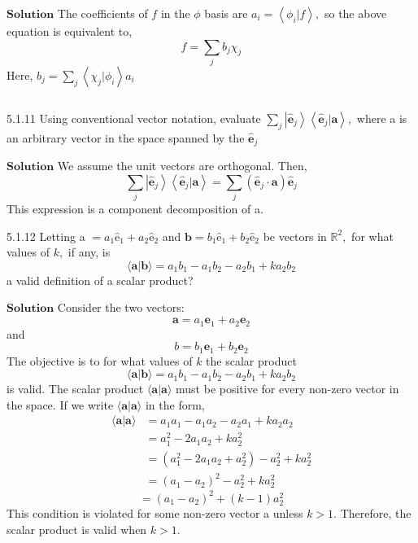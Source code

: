 $\boxed{\textbf{Solution}}$ The coefficients of $f$ in the $\phi$ basis are $a_{i}=\left\langle\phi_{i} | f\right\rangle,$ so the above equation is equivalent to,
$$
f=\sum_{j} b_{j} \chi_{j}
$$
Here, $b_{j}=\sum_{j}\left\langle\chi_{j} | \phi_{i}\right\rangle a_{i}$

$$$$

\begin{mybox}{5.1.11}
Using conventional vector notation, evaluate $\sum_{j}\left|\hat{\mathbf{e}}_{j}\right\rangle\left\langle\hat{\mathbf{e}}_{j} | \mathbf{a}\right\rangle,$ where a is an arbitrary vector in the space spanned by the $\hat{\mathbf{e}}_{j}$
\end{mybox}

$\boxed{\textbf{Solution}}$  We assume the unit vectors are orthogonal. Then,
$$
\sum_{j}\left|\hat{\mathbf{e}}_{j}\right\rangle\left\langle\hat{\mathbf{e}}_{j} | \mathbf{a}\right\rangle=\sum_{j}\left(\hat{\mathbf{e}}_{j} \cdot \mathbf{a}\right) \hat{\mathbf{e}}_{j}
$$
This expression is a component decomposition of a.

\newpage


\begin{mybox}{5.1.12}
Letting a $=a_{1} \hat{\mathrm{e}}_{1}+a_{2} \hat{\mathrm{e}}_{2}$ and $\mathbf{b}=b_{1} \hat{\mathrm{e}}_{1}+b_{2} \hat{\mathrm{e}}_{2}$ be vectors in $\mathbb{R}^{2},$ for what values of $k,$ if
any, is
$$
\langle\mathbf{a} | \mathbf{b}\rangle=a_{1} b_{1}-a_{1} b_{2}-a_{2} b_{1}+k a_{2} b_{2}
$$
a valid definition of a scalar product?
\end{mybox}

$\boxed{\textbf{Solution}}$ Consider the two vectors:
$$\mathbf{a}=a_{1} \mathbf{e}_{1}+a_{2} \mathbf{e}_{2}$$ 
and 
$$b=b_{1} \mathbf{e}_{1}+b_{2} \mathbf{e}_{2}$$
The objective is to for what values of $k$ the scalar product 
$$\langle\mathbf{a} | \mathbf{b}\rangle=a_{1} b_{1}-a_{1} b_{2}-a_{2} b_{1}+k a_{2} b_{2}$$
is valid. The scalar product $\langle\mathbf{a} | \mathbf{a}\rangle$ must be positive for every non-zero vector in the space. If we write
$\langle\mathbf{a} | \mathbf{a}\rangle$ in the form,
$$
\begin{aligned}
\langle\mathbf{a} | \mathbf{a}\rangle &=a_{1} a_{1}-a_{1} a_{2}-a_{2} a_{1}+k a_{2} a_{2} \\
&=a_{1}^{2}-2 a_{1} a_{2}+k a_{2}^{2} \\
&=\left(a_{1}^{2}-2 a_{1} a_{2}+a_{2}^{2}\right)-a_{2}^{2}+k a_{2}^{2} \\
&=\left(a_{1}-a_{2}\right)^{2}-a_{2}^{2}+k a_{2}^{2}
\end{aligned}
$$
$$
=\left(a_{1}-a_{2}\right)^{2}+(k-1) a_{2}^{2}
$$
This condition is violated for some non-zero vector a unless $k>1$.
Therefore, the scalar product is valid when $k>1$.
